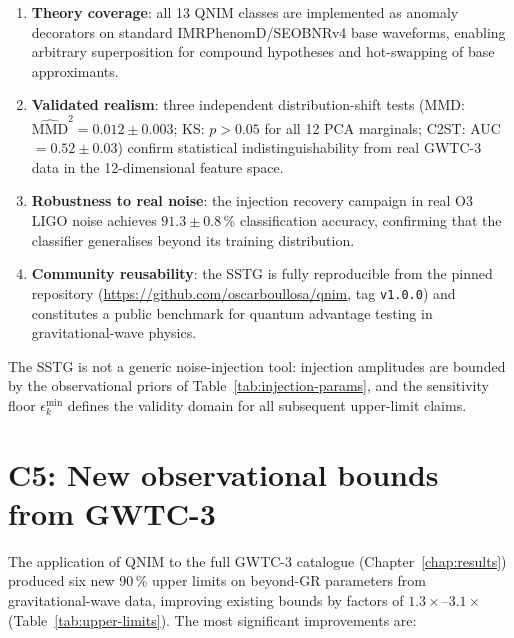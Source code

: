 \documentclass[11pt,a4paper, english]{book}
\theoremstyle{plain}
\theoremstyle{definition}
\numberwithin{equation}{chapter}
\numberwithin{figure}{chapter}
\numberwithin{table}{chapter}
\begin{document}
\begin{enumerate}
  \item \textbf{Theory coverage}: all 13 QNIM classes are implemented
        as anomaly decorators on standard IMRPhenomD/SEOBNRv4 base
        waveforms, enabling arbitrary superposition for compound
        hypotheses and hot-swapping of base approximants.

  \item \textbf{Validated realism}: three independent distribution-shift
        tests (MMD: $\hat{\mathrm{MMD}}^2 = 0.012 \pm 0.003$;
        KS: $p > 0.05$ for all 12 PCA marginals;
        C2ST: AUC $= 0.52 \pm 0.03$) confirm statistical
        indistinguishability from real GWTC-3 data in the 12-dimensional
        feature space.

  \item \textbf{Robustness to real noise}: the injection recovery campaign
        in real O3 LIGO noise achieves $91.3 \pm 0.8\,\%$ classification
        accuracy, confirming that the classifier generalises beyond its
        training distribution.

  \item \textbf{Community reusability}: the SSTG is fully reproducible
        from the pinned repository (\url{https://github.com/oscarboullosa/qnim},
        tag \texttt{v1.0.0}) and constitutes a public benchmark for
        quantum advantage testing in gravitational-wave physics.
\end{enumerate}

The SSTG is not a generic noise-injection tool: injection amplitudes are
bounded by the observational priors of Table~\ref{tab:injection-params},
and the sensitivity floor $\epsilon_k^\mathrm{min}$ defines the validity
domain for all subsequent upper-limit claims.

\section{C5: New observational bounds from GWTC-3}
\label{app:contrib5}

The application of QNIM to the full GWTC-3 catalogue
(Chapter~\ref{chap:results}) produced six new 90\,\% upper limits on
beyond-GR parameters from gravitational-wave data, improving existing
bounds by factors of $1.3\times$--$3.1\times$
(Table~\ref{tab:upper-limits}).  The most significant improvements are:
\end{document}
